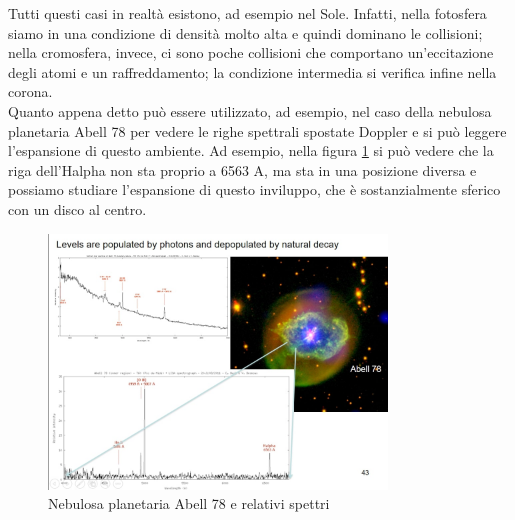 \documentclass[a4paper,11pt]{article}
\begin{document}
Tutti questi casi in realtà esistono, ad esempio nel Sole. Infatti, nella fotosfera siamo in una condizione di densità molto alta e quindi dominano le collisioni; nella cromosfera, invece, ci sono poche collisioni che comportano un'eccitazione degli atomi e un raffreddamento; la condizione intermedia si verifica infine nella corona. \\
Quanto appena detto può essere utilizzato, ad esempio, nel caso della nebulosa planetaria Abell 78 per vedere le righe spettrali spostate Doppler e si può leggere l'espansione di questo ambiente. Ad esempio, nella figura \ref{fig:Abell} si può vedere che la riga dell'Halpha non sta proprio a 6563 A, ma sta in una posizione diversa e possiamo studiare l'espansione di questo inviluppo, che è sostanzialmente sferico con un disco al centro.
\begin{figure}[h!!]
        \centering
        \includegraphics[width=9cm]{abell.jpg}
        \caption{Nebulosa planetaria Abell 78 e relativi spettri}
        \label{fig:Abell}
    \end{figure}
    \newpage
\end{document}
